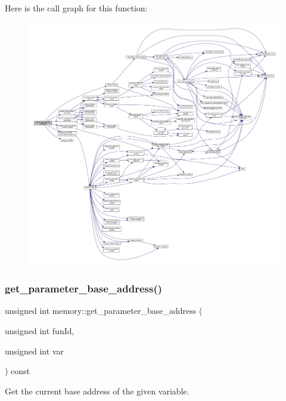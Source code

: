 Here is the call graph for this function\+:
\nopagebreak
\begin{figure}[H]
\begin{center}
\leavevmode
\includegraphics[width=350pt]{d8/d99/classmemory_a0b03a8a5198dc85c9c6b1f26bc5464ec_cgraph}
\end{center}
\end{figure}
\mbox{\label{classmemory_a6488e1ee13bcf993f0406c377b4f42e4}} 
\subsubsection{\texorpdfstring{get\+\_\+parameter\+\_\+base\+\_\+address()}{get\_parameter\_base\_address()}}
{\footnotesize\ttfamily unsigned int memory\+::get\+\_\+parameter\+\_\+base\+\_\+address (\begin{DoxyParamCaption}\item[{unsigned int}]{fun\+Id,  }\item[{unsigned int}]{var }\end{DoxyParamCaption}) const}



Get the current base address of the given variable. 



